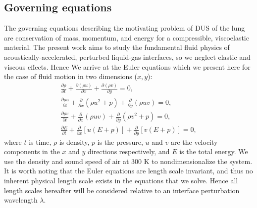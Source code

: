 \subsection{Governing equations}
The governing equations describing the motivating problem of \ac{DUS}
of the lung are conservation of mass, momentum, and energy for a
compressible, viscoelastic material. The present work aims to
study the fundamental fluid physics of acoustically-accelerated,
perturbed liquid-gas interfaces, so we neglect elastic and viscous
effects. Hence We arrive at the Euler equations which we present here
for the case of fluid motion in two dimensions ($x,y$):
% 
\begin{subequations} \label{eq:euler}%
  \begin{align}%
    \frac{\partial \rho}{\partial t} + \frac{\partial \left(\rho u\right)}{\partial x} + \frac{\partial \left(\rho v\right)}{\partial y} = 0,\\
    \frac{\partial \rho u}{\partial t} + \frac{\partial}{\partial x}\left( \rho u^2+p\right)  + \frac{\partial}{\partial y}\left( \rho uv\right) = 0,\\
    \frac{\partial \rho v}{\partial t} + \frac{\partial}{\partial x}\left( \rho uv\right)  + \frac{\partial}{\partial y}\left( \rho v^2+p\right) = 0,\\
    \frac{\partial E}{\partial t} + \frac{\partial}{\partial x}\left[u\left(E+p\right)\right] + \frac{\partial}{\partial y}\left[v\left(E+p\right)\right] = 0,
  \end{align}%
\end{subequations}%
% 
where $t$ is time, $\rho$ is density, $p$ is the pressure, $u$ and $v$
are the velocity components in the $x$ and $y$ directions
respectively, and $E$ is the total energy. We use the density and
sound speed of air at 300 K to nondimensionalize the system. It is
worth noting that the Euler equations are length scale invariant, and
thus no inherent physical length scale exists in the equations that we
solve. Hence all length scales hereafter will be considered relative
to an interface perturbation wavelength $\lambda$.

